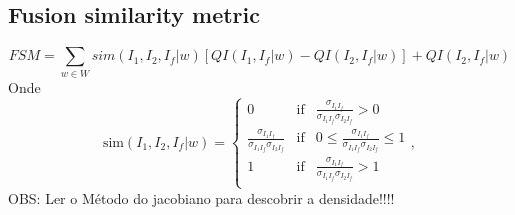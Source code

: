 \documentclass[conference]{IEEEtran}
\begin{document}
\subsection{Fusion similarity metric}
\begin{equation}
FSM = \sum_{w\in W} sim(I_1,I_2,I_f|w)[QI(I_1,I_f|w)-QI(I_2,I_f|w)]+QI(I_2,I_f|w) 
\end{equation}
Onde
\begin{equation}
\text{sim}(I_1,I_2,I_f|w) = \left\{
\begin{array}{ccc}
    0   & \text{if} &  \frac{\sigma_{I_1I_f}}{\sigma_{I_1I_f}\sigma_{I_2I_f}} > 0  \\
    \frac{\sigma_{I_1I_f}}{\sigma_{I_1I_f}\sigma_{I_2I_f}}  & \text{if} &  0\le \frac{\sigma_{I_1I_f}}{\sigma_{I_1I_f}\sigma_{I_2I_f}} \le 1  \\
        1   & \text{if} &  \frac{\sigma_{I_1I_f}}{\sigma_{I_1I_f}\sigma_{I_2I_f}} > 1  \\
\end{array}
\right.,
\end{equation}
OBS: Ler o Método do jacobiano para descobrir a densidade!!!! 


\end{document}
